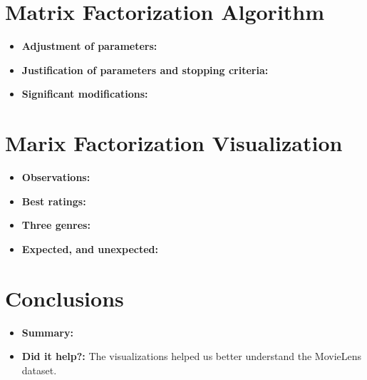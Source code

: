 \section{Matrix Factorization Algorithm}
\medskip
\begin{itemize}
  \item \textbf{Adjustment of parameters:}
  \item \textbf{Justification of parameters and stopping criteria:}
  \item \textbf{Significant modifications:}
\end{itemize}


\section{Marix Factorization Visualization}
\medskip
\begin{itemize}
  \item \textbf{Observations:}
  \item \textbf{Best ratings:}
  \item \textbf{Three genres:}
  \item \textbf{Expected, and unexpected:}
\end{itemize}



\section{Conclusions}
\medskip
\begin{itemize}
  \item \textbf{Summary:}
  \item \textbf{Did it help?:} The visualizations helped us better understand the MovieLens dataset. 
\end{itemize}


